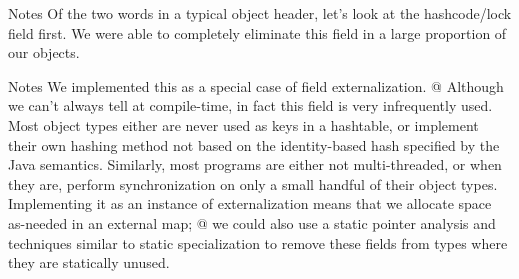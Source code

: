 \documentclass[%
pdf,
colorBG,
slideColor,
nototal,
oqe
]{prosper}
\newenvironment{talknotes}{\begin{slide}{Notes}\tiny}{\end{slide}}
\begin{document}
\begin{talknotes}
Of the two words in a typical object header, let's look at the
hashcode/lock field first.  We were able to completely eliminate this
field in a large proportion of our objects.
\end{talknotes}


\begin{talknotes}
We implemented this as a special case of field externalization.
@ Although we can't always tell at compile-time, in fact this field
is very infrequently used.  Most object types either are never used as keys
in a hashtable, or implement their own hashing method not based on the
identity-based hash specified by the Java semantics.  Similarly, most
programs are either not multi-threaded, or when they are, perform
synchronization on only a small handful of their object types.
Implementing it as an instance of externalization means that we
allocate space as-needed in an external map; @ we could also use
a static pointer analysis and techniques similar to static
specialization to remove these fields from types where they
are statically unused.
\end{talknotes}
\end{document}
